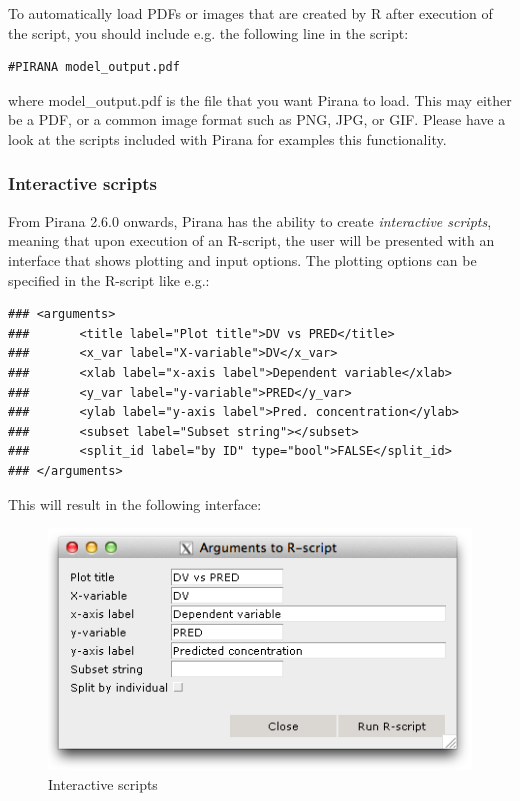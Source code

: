 {{{{\vspace{15pt} \noindent To automatically load PDFs or images that are created by
R after execution of the script, you should include e.g. the following line in
the script:

\begin{lstlisting}
#PIRANA model_output.pdf
\end{lstlisting}

\noindent where model\_output.pdf is the file that you want Pirana
to load. This may either be a PDF, or a common image format such as
PNG, JPG, or GIF. Please have a look at the scripts included with
Pirana for examples this
functionality.

\subsubsection*{Interactive scripts}
From Pirana 2.6.0 onwards, Pirana has the ability to create
\textit{interactive scripts}, meaning that upon execution of an
R-script, the user will be presented with an
interface that shows plotting and input options. The plotting options can be
specified in the R-script like e.g.:

\begin{lstlisting}
### <arguments>
###       <title label="Plot title">DV vs PRED</title>
###       <x_var label="X-variable">DV</x_var>
###       <xlab label="x-axis label">Dependent variable</xlab>
###       <y_var label="y-variable">PRED</y_var>
###       <ylab label="y-axis label">Pred. concentration</ylab>
###       <subset label="Subset string"></subset>
###       <split_id label="by ID" type="bool">FALSE</split_id>
### </arguments>
\end{lstlisting}

\vspace{4pt}

\noindent This will result in the following interface:

\begin{figure}[H] \centering
    \includegraphics[scale=0.5]{images/interactive_scripts.png}
    \caption{Interactive scripts}
\end{figure}

}}}}
